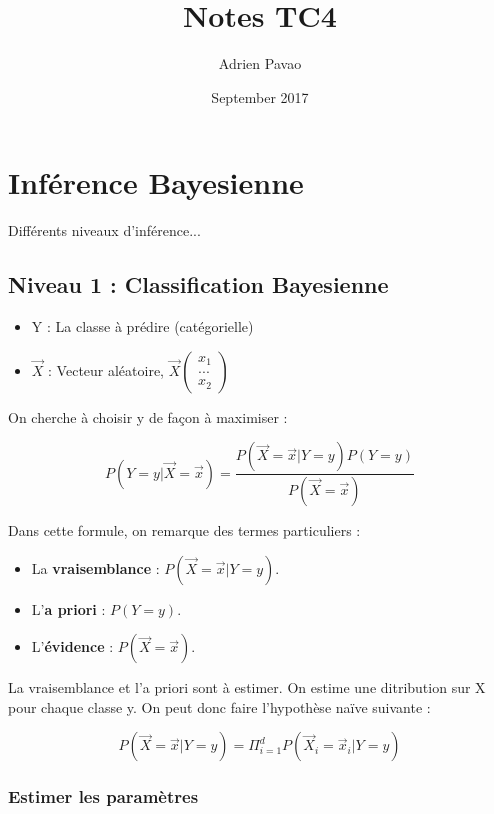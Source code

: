 \documentclass{article}
\title{Notes TC4}
\author{Adrien Pavao}
\date{September 2017}
\begin{document}
\maketitle

\tableofcontents

\section{Inférence Bayesienne}

Différents niveaux d'inférence...

\subsection{Niveau 1 : Classification Bayesienne}

\begin{itemize}
\item Y : La classe à prédire (catégorielle)
\item $\vec{X}$ : Vecteur aléatoire, \( \vec{X} 
\begin{pmatrix} 
      x_1\\ 
      ...\\
      x_2 
\end{pmatrix} \)

\end{itemize}

On cherche à choisir y de façon à maximiser : 

\[ P(Y=y | \vec{X} = \vec{x}) = \frac{P(\vec{X} = \vec{x} | Y=y)P(Y=y)}{P(\vec{X} = \vec{x})} \]

Dans cette formule, on remarque des termes particuliers : 

\begin{itemize}

\item La \textbf{vraisemblance} : $P(\vec{X} = \vec{x} | Y = y)$.
\item L'\textbf{a priori} : $P(Y = y)$.
\item L'\textbf{évidence} : $P(\vec{X} = \vec{x})$.

\end{itemize}

La vraisemblance et l'a priori sont à estimer. On estime une ditribution sur X pour chaque classe y.
On peut donc faire l'hypothèse naïve suivante : 

\[ P(\vec{X}=\vec{x} | Y=y) = \Pi_{i=1}^{d} P(\vec{X}_i = \vec{x}_i | Y = y) \]

\subsubsection*{Estimer les paramètres}
\end{document}
